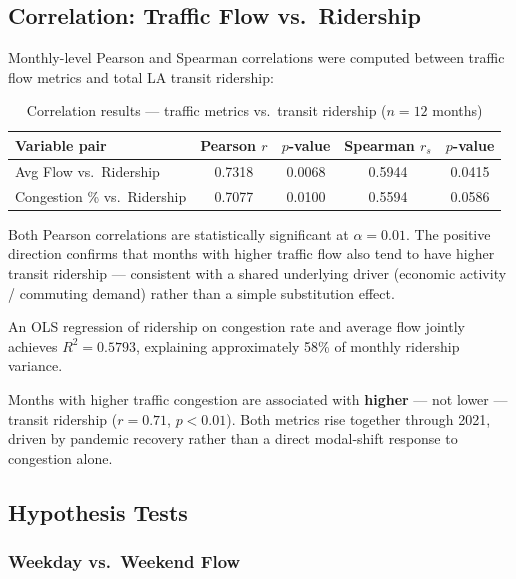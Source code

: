 \documentclass[12pt,a4paper]{article}
\begin{document}
\subsection{Correlation: Traffic Flow vs.\ Ridership}

Monthly-level Pearson and Spearman correlations were computed between traffic flow metrics and total LA transit ridership:

\begin{table}[H]
\centering
\caption{Correlation results — traffic metrics vs.\ transit ridership ($n=12$ months)}
\begin{tabular}{lcccc}
\toprule
\textbf{Variable pair} & \textbf{Pearson $r$} & \textbf{$p$-value} & \textbf{Spearman $r_s$} & \textbf{$p$-value} \\
\midrule
Avg Flow vs.\ Ridership        & 0.7318 & 0.0068 & 0.5944 & 0.0415 \\
Congestion \% vs.\ Ridership   & 0.7077 & 0.0100 & 0.5594 & 0.0586 \\
\bottomrule
\end{tabular}
\end{table}

Both Pearson correlations are statistically significant at $\alpha = 0.01$. The positive direction confirms that months with higher traffic flow also tend to have higher transit ridership — consistent with a shared underlying driver (economic activity / commuting demand) rather than a simple substitution effect.

An OLS regression of ridership on congestion rate and average flow jointly achieves $R^2 = 0.5793$, explaining approximately 58\% of monthly ridership variance.

\begin{tcolorbox}[finding]
Months with higher traffic congestion are associated with \textbf{higher} — not lower — transit ridership ($r = 0.71$, $p < 0.01$). Both metrics rise together through 2021, driven by pandemic recovery rather than a direct modal-shift response to congestion alone.
\end{tcolorbox}

\subsection{Hypothesis Tests}

\subsubsection{Weekday vs.\ Weekend Flow}
\end{document}
